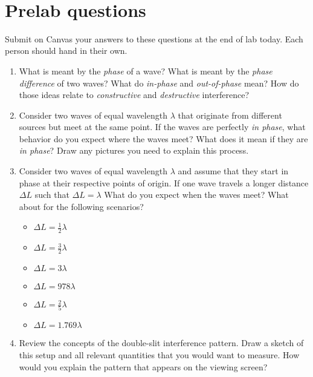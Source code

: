 \documentclass{tufte-handout}
\begin{document}



\vspace{0.5cm}
\\
\vspace{0.5cm}

\section{Prelab questions}
Submit on Canvas your answers to these questions at the end of lab today. Each person should hand in their own.

\begin{enumerate}

\item What is meant by the {\em phase} of a wave?  What is meant by the {\em phase difference} of two waves? What do {\em in-phase} and {\em out-of-phase} mean?  How do those ideas relate to {\em constructive} and {\em destructive} interference?

\item Consider two waves of equal wavelength $\lambda$ that originate from 
different sources but meet at the same point.
If the waves are perfectly {\it in phase}, what behavior do you expect where the waves meet?
What does it mean if they are {\it in phase}? Draw any pictures you need to explain this process.

\item Consider two waves of equal wavelength $\lambda$ and assume that they start in phase at their respective
points of origin. If one wave travels a longer distance $\Delta L$ such that $\Delta L = \lambda$
What do you expect when the waves meet? What about for the following scenarios?
\begin{itemize}[itemsep=0pt,parsep=0pt,topsep=0pt,partopsep=0pt]
    \item $\Delta L = \frac{1}{2}\lambda$
    \item $\Delta L = \frac{3}{2}\lambda$
    \item $\Delta L = 3\lambda$
    \item $\Delta L = 978\lambda$
    \item $\Delta L = \frac{2}{5}\lambda$
    \item $\Delta L = 1.769\lambda$
\end{itemize}

\item Review the concepts of the double-slit interference pattern. Draw a sketch of this setup and
all relevant quantities that you would want to measure. How would you explain the pattern that appears on the 
viewing screen?


\end{enumerate}
\end{document}
